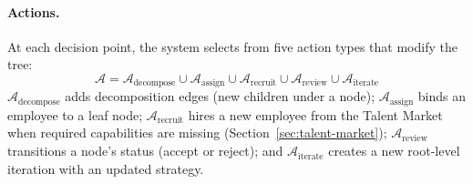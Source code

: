 \documentclass[11pt,a4paper]{article}
\begin{document}
\paragraph{Actions.}
At each decision point, the system selects from five action types that modify the tree:
\begin{equation}
\mathcal{A} = \mathcal{A}_{\text{decompose}} \cup \mathcal{A}_{\text{assign}} \cup \mathcal{A}_{\text{recruit}} \cup \mathcal{A}_{\text{review}} \cup \mathcal{A}_{\text{iterate}}
\end{equation}
$\mathcal{A}_{\text{decompose}}$ adds decomposition edges (new children under a node); $\mathcal{A}_{\text{assign}}$ binds an employee to a leaf node; $\mathcal{A}_{\text{recruit}}$ hires a new employee from the Talent Market when required capabilities are missing (Section~\ref{sec:talent-market}); $\mathcal{A}_{\text{review}}$ transitions a node’s status (accept or reject); and $\mathcal{A}_{\text{iterate}}$ creates a new root-level iteration with an updated strategy.
\end{document}
